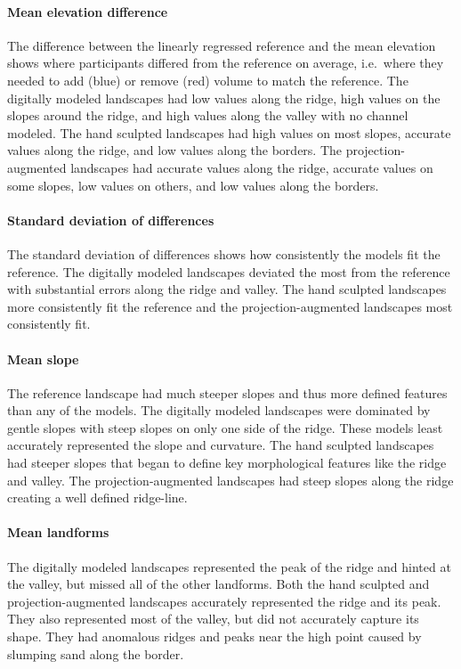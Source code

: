 \documentclass[prodmode,acmtochi]{acmsmall} %
\begin{document}
\paragraph{Mean elevation difference}
The difference between the linearly regressed reference and the mean elevation
shows where participants 
differed from the reference on average, i.e.~where they 
needed to add (blue) or remove (red) volume to match the reference. 
%
The digitally modeled landscapes 
had low values along the ridge,
high values on the slopes around the ridge,
and high values along the valley
with no channel modeled.
% 
The hand sculpted landscapes 
had high values on most slopes,
accurate values along the ridge, 
and low values along the borders.
%
The projection-augmented landscapes 
had accurate values along the ridge,
accurate values on some slopes, 
low values on others, 
and low values along the borders.

\paragraph{Standard deviation of differences}
The standard deviation of differences shows 
how consistently the models fit the reference. 
%
The digitally modeled landscapes deviated the most from the reference
with substantial errors along the ridge and valley. 
%
The hand sculpted landscapes 
more consistently fit the reference
and
the projection-augmented landscapes 
most consistently fit. 

\paragraph{Mean slope}
The reference landscape had 
much steeper slopes and thus more 
defined features
than any of the models.
%
The digitally modeled landscapes
were dominated by gentle slopes
with steep slopes on only one side of the ridge.
These models
least accurately represented the slope and curvature.
% 
The hand sculpted landscapes 
had steeper slopes
that began to define key morphological features 
like the ridge and valley.
%
The projection-augmented landscapes 
had steep slopes along the ridge
creating a well defined ridge-line. 

\paragraph{Mean landforms}
The digitally modeled landscapes
represented the peak of the ridge
and hinted at the valley, 
but missed all of the other landforms.
% 
Both the hand sculpted and projection-augmented landscapes 
accurately represented the ridge and its peak.
They also represented most of the valley,
but did not accurately capture its shape. 
They had anomalous ridges and peaks 
near the high point
caused by slumping sand along the border.
\end{document}
